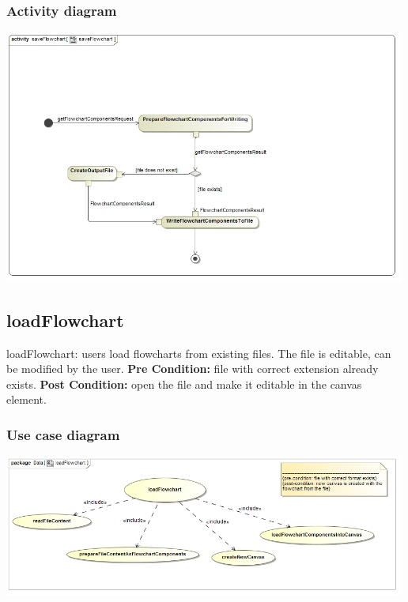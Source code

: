 \documentclass[11pt,a4paper,titlepage]{article}
\begin{document}
\subsubsection{Activity diagram}
\includegraphics[width=500px]{saveFlowchart.jpg}

\subsection{loadFlowchart}
loadFlowchart: users load flowcharts from existing files. The file is editable, can be modified by the user.\newline\newline
\textbf{Pre Condition:} file with correct extension already exists.\newline
\textbf{Post Condition:} open the file and make it editable in the canvas element.

\subsubsection{Use case diagram}
\includegraphics[width=500px]{loadFlowchart_use_case_diagram.jpg}
\end{document}
